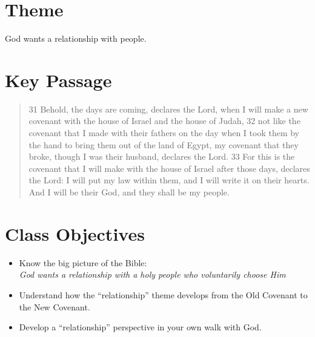 \newpage
\section*{Theme}

\begin{center}
\Large God wants a relationship with people.
\end{center}

\section*{Key Passage}\label{sec:KeyPassage}

\begin{quote}
31 Behold, the days are coming, declares the Lord, when I will make a new covenant with the house of Israel and the house of Judah, 32 not like the covenant that I made with their fathers on the day when I took them by the hand to bring them out of the land of Egypt, my covenant that they broke, though I was their husband, declares the Lord. 33 For this is the covenant that I will make with the house of Israel after those days, declares the Lord: I will put my law within them, and I will write it on their hearts. And I will be their God, and they shall be my people. 
\end{quote}

\section*{Class Objectives}\label{sec:ClassObjectives}
\begin{itemize}
\item Know the big picture of the Bible:\\\emph{God wants a relationship with a holy people who voluntarily choose Him}
\item Understand how the ``relationship'' theme develops from the Old Covenant to the New Covenant.
\item Develop a ``relationship'' perspective in your own walk with God.
\end{itemize}
